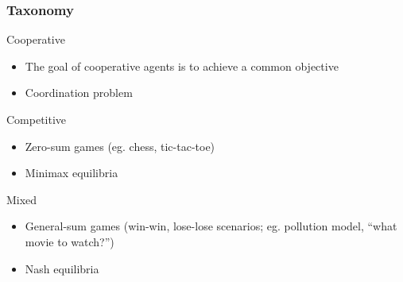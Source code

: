 \documentclass{beamer}
\begin{document}
    \begin{frame}
        \frametitle{Taxonomy}

        \begin{block}{Cooperative}
            \begin{itemize}
                \item The goal of cooperative agents is to achieve a common objective
                \item Coordination problem
            \end{itemize}
        \end{block}

        \begin{block}{Competitive}
            \begin{itemize}
                \item Zero-sum games (eg. chess, tic-tac-toe)
                \item Minimax equilibria
            \end{itemize}
        \end{block}

        \begin{block}{Mixed}
            \begin{itemize}
                \item  General-sum games (win-win, lose-lose scenarios;
                eg. pollution model, ``what movie to watch?'')
                \item  Nash equilibria
            \end{itemize}
        \end{block}

    \end{frame}

\end{document}
